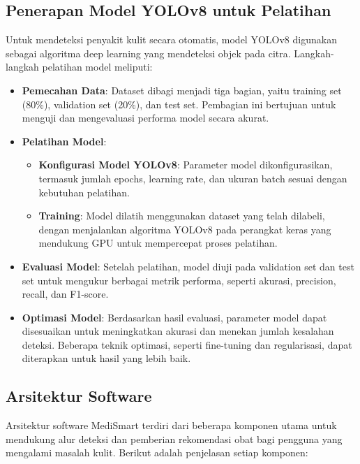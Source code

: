 \documentclass[journal,article,submit,pdftex,moreauthors]{Definitions/mdpi}
\begin{document}
\subsection{Penerapan Model YOLOv8 untuk Pelatihan}

Untuk mendeteksi penyakit kulit secara otomatis, model YOLOv8 digunakan sebagai algoritma deep learning yang mendeteksi objek pada citra. Langkah-langkah pelatihan model meliputi:
\begin{itemize}
    \item \textbf{Pemecahan Data}: Dataset dibagi menjadi tiga bagian, yaitu training set (80\%), validation set (20\%), dan test set. Pembagian ini bertujuan untuk menguji dan mengevaluasi performa model secara akurat.
    
    \item \textbf{Pelatihan Model}: 
    \begin{itemize}
        \item \textbf{Konfigurasi Model YOLOv8}: Parameter model dikonfigurasikan, termasuk jumlah epochs, learning rate, dan ukuran batch sesuai dengan kebutuhan pelatihan.
        \item \textbf{Training}: Model dilatih menggunakan dataset yang telah dilabeli, dengan menjalankan algoritma YOLOv8 pada perangkat keras yang mendukung GPU untuk mempercepat proses pelatihan.
    \end{itemize}

    \item \textbf{Evaluasi Model}: Setelah pelatihan, model diuji pada validation set dan test set untuk mengukur berbagai metrik performa, seperti akurasi, precision, recall, dan F1-score.
    
    \item \textbf{Optimasi Model}: Berdasarkan hasil evaluasi, parameter model dapat disesuaikan untuk meningkatkan akurasi dan menekan jumlah kesalahan deteksi. Beberapa teknik optimasi, seperti fine-tuning dan regularisasi, dapat diterapkan untuk hasil yang lebih baik.
\end{itemize}



\subsection{Arsitektur Software}
Arsitektur software MediSmart terdiri dari beberapa komponen utama untuk mendukung alur deteksi dan pemberian rekomendasi obat bagi pengguna yang mengalami masalah kulit. Berikut adalah penjelasan setiap komponen:
\end{document}
